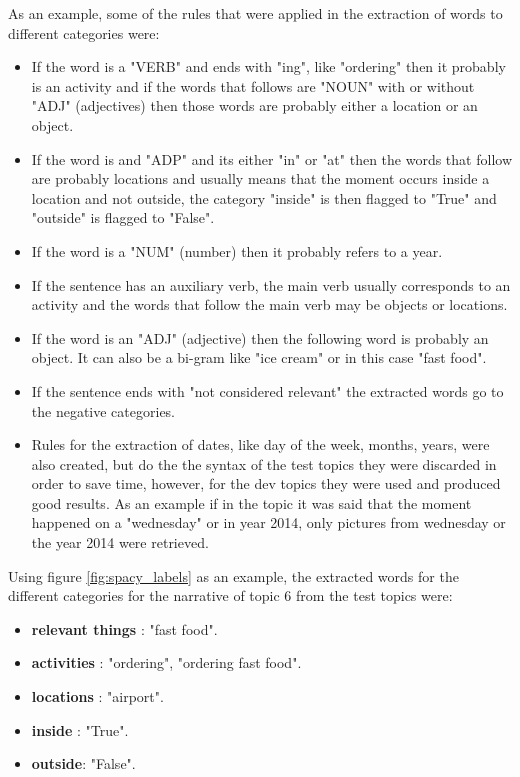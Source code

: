   \newpage
  
  As an example, some of the rules that were applied in the extraction of words to different categories were:
  
  \begin{itemize}
    \itemsep0em
      \item  If the word is a "VERB" and ends with "ing", like "ordering" then it probably is an activity and if the words that follows are "NOUN" with or without "ADJ" (adjectives) then those words are probably either a location or an object.
      \item  If the word is and "ADP" and its either "in" or "at" then the words that follow are probably locations and usually means that the moment occurs inside a location and not outside, the category "inside" is then flagged to "True" and "outside" is flagged to "False".
      \item If the word is a "NUM" (number) then it probably refers to a year.
      \item If the sentence has an auxiliary verb, the main verb usually corresponds to an activity and the words that follow the main verb may be objects or locations.
      \item If the word is an "ADJ" (adjective) then the following word is probably an object. It can also be a bi-gram like "ice cream" or in this case "fast food".
      \item If the sentence ends with "not considered relevant" the extracted words go to the negative categories.
      \item Rules for the extraction of dates, like day of the week, months, years, were also created, but do the the syntax of the test topics they were discarded in order to save time, however, for the dev topics they were used and produced good results. As an example if in the topic it was said that the moment happened on a "wednesday" or in year 2014, only pictures from wednesday or the year 2014 were retrieved.

    \end{itemize}


Using figure \ref{fig:spacy_labels} as an example, the extracted words for the different categories for the narrative of topic 6 from the test topics were:

    \begin{itemize}
        \item \textbf{relevant things} : "fast food".
        \item \textbf{activities} : "ordering", "ordering fast food".
        \item \textbf{locations} : "airport".
        \item \textbf{inside} : "True".
        \item \textbf{outside}: "False".
       
    \end{itemize}

